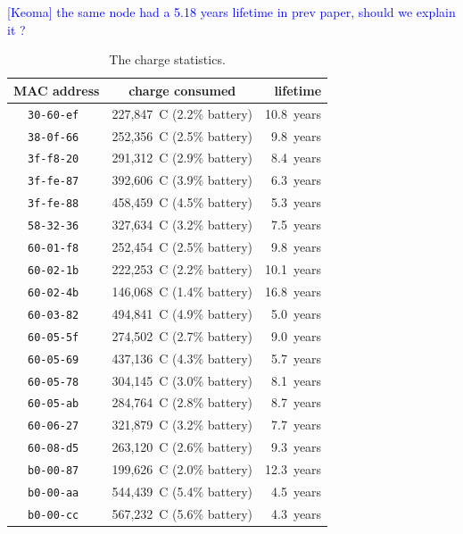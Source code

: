 \documentclass{sig-alternate}
\newcommand{\keoma}[1]       {\textcolor{blue}{[Keoma] #1}}
\begin{document}
\keoma{the same node had a 5.18 years lifetime in prev paper, should we explain it ?}

\begin{table}
  \begin{tabular}{|c|c|r|}
     \hline
     MAC address    & charge consumed           &   lifetime \\
     \hline
     \tt{30-60-ef}  & 227,847~C (2.2\% battery) & 10.8~years \\
     \tt{38-0f-66}  & 252,356~C (2.5\% battery) &  9.8~years \\
     \tt{3f-f8-20}  & 291,312~C (2.9\% battery) &  8.4~years \\
     \tt{3f-fe-87}  & 392,606~C (3.9\% battery) &  6.3~years \\
     \tt{3f-fe-88}  & 458,459~C (4.5\% battery) &  5.3~years \\
     \tt{58-32-36}  & 327,634~C (3.2\% battery) &  7.5~years \\
     \tt{60-01-f8}  & 252,454~C (2.5\% battery) &  9.8~years \\
     \tt{60-02-1b}  & 222,253~C (2.2\% battery) & 10.1~years \\
     \tt{60-02-4b}  & 146,068~C (1.4\% battery) & 16.8~years \\
     \tt{60-03-82}  & 494,841~C (4.9\% battery) &  5.0~years \\
     \tt{60-05-5f}  & 274,502~C (2.7\% battery) &  9.0~years \\
     \tt{60-05-69}  & 437,136~C (4.3\% battery) &  5.7~years \\
     \tt{60-05-78}  & 304,145~C (3.0\% battery) &  8.1~years \\
     \tt{60-05-ab}  & 284,764~C (2.8\% battery) &  8.7~years \\
     \tt{60-06-27}  & 321,879~C (3.2\% battery) &  7.7~years \\
     \tt{60-08-d5}  & 263,120~C (2.6\% battery) &  9.3~years \\
     \tt{b0-00-87}  & 199,626~C (2.0\% battery) & 12.3~years \\
     \tt{b0-00-aa}  & 544,439~C (5.4\% battery) &  4.5~years \\
     \tt{b0-00-cc}  & 567,232~C (5.6\% battery) &  4.3~years \\
     \hline
  \end{tabular}
  \caption{The charge statistics.}
  \label{tab:stats_charge}
\end{table}

\end{document}
